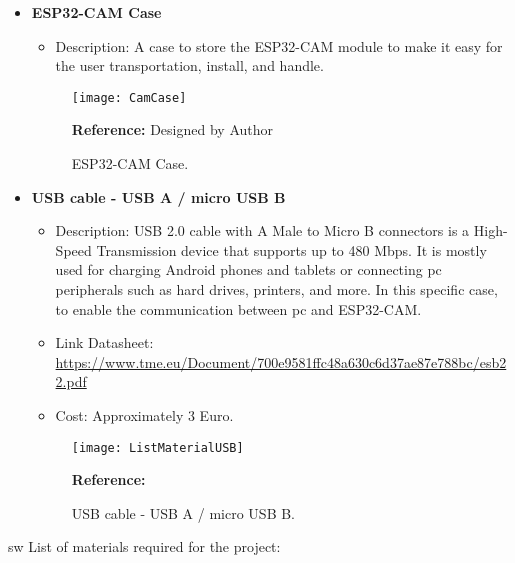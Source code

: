 \begin{itemize}
	\item \textbf{ESP32-CAM Case} \\
	\begin{itemize}
		\item Description: A case to store the ESP32-CAM module to make it easy for the user transportation, install, and handle.
	\end{itemize}
\begin{figure}  [H]
	\begin{center}
		\texttt{[image: CamCase]}
		\caption{ESP32-CAM Case.} 
		\label{fig:ESP32-CAM Case.}
		\footnotesize \textbf{Reference:} Designed by Author
	\end{center}
\end{figure}	

	\item \textbf{USB cable - USB A / micro USB B}\\
	\begin{itemize}
		\item Description: USB 2.0 cable with A Male to Micro B connectors is a High-Speed Transmission device that supports up to 480 Mbps. It is mostly used for charging Android phones and tablets or connecting \ac{pc} peripherals such as hard drives, printers, and more. In this specific case, to enable the communication between \ac{pc} and ESP32-CAM.
		\item Link Datasheet: \url{https://www.tme.eu/Document/700e9581ffc48a630c6d37ae87e788bc/esb22.pdf}
		\item Cost: Approximately 3 Euro.
	\end{itemize}
	\begin{figure}  [H]
		\begin{center}
			\texttt{[image: ListMaterialUSB]}
			\caption{USB cable - USB A / micro USB B.} 
			\label{fig:USB cable - USB A / micro USB B.}
			\footnotesize \textbf{Reference:} \autocite{Tradeinn:2022}
		\end{center}
	\end{figure}	
\end{itemize}
\ac{sw} List of materials required for the project:
